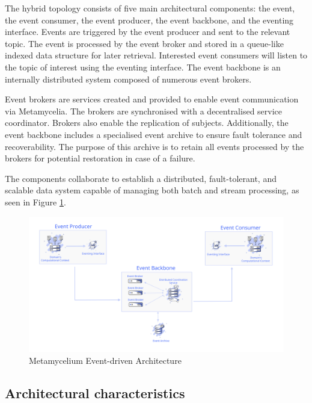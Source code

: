 \documentclass[preprint,12pt]{elsarticle}
\begin{document}
The hybrid topology consists of five main architectural components: the event, the event consumer, the event producer, the event backbone, and the eventing interface. Events are triggered by the event producer and sent to the relevant topic. The event is processed by the event broker and stored in a queue-like indexed data structure for later retrieval. Interested event consumers will listen to the topic of interest using the eventing interface. The event backbone is an internally distributed system composed of numerous event brokers. 

Event brokers are services created and provided to enable event communication via Metamycelia. The brokers are synchronised with a decentralised service coordinator. Brokers also enable the replication of subjects. Additionally, the event backbone includes a specialised event archive to ensure fault tolerance and recoverability. The purpose of this archive is to retain all events processed by the brokers for potential restoration in case of a failure. 




The components collaborate to establish a distributed, fault-tolerant, and scalable data system capable of managing both batch and stream processing, as seen in Figure \ref{fig:eventDrivenArchitecture}. 

\begin{figure}[h]
  \centering
  \includegraphics[width=\textwidth]{images/Event-architecture.png}
  \caption{Metamycelium Event-driven Architecture}
  \label{fig:eventDrivenArchitecture}
\end{figure}


\subsection{Architectural characteristics}
\end{document}
